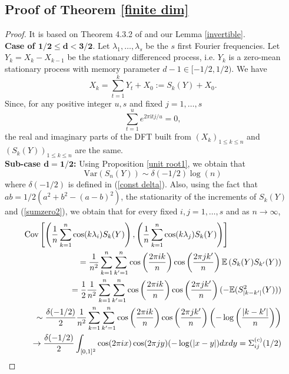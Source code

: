 \documentclass[12pt]{article}
\numberwithin{equation}{section}
\def\i{\mathrm{i}}
\begin{document}
\subsection{Proof of Theorem \ref{finite dim}}
\begin{proof} 
It is based on Theorem 4.3.2 of \cite{MR2977317} and our Lemma \ref{invertible}.\\
{\bf Case of $\mathbf{1/2\le d<3/2.}$} Let $\lambda_1,\ldots,\lambda_s$ be the $s$ first  Fourier frequencies. 
Let $Y_k=X_k-X_{k-1}$ be the stationary differenced process, i.e. $Y_k$ is a zero-mean stationary process with memory parameter $d-1\in[-1/2,1/2)$. We have
$$
X_k=\sum_{t=1}^kY_t+X_0:=S_k(Y)+X_0.
$$
Since, for any positive integer $u,s$ and fixed $j=1,\ldots,s$
\begin{equation}\label{sumzero2}
\sum_{t=1}^ue^{2\pi \i tj/u}=0,
\end{equation}
the real and imaginary parts of the DFT built from $(X_k)_{1\le k\le n}$ and $(S_k(Y))_{1\le k\le n}$ are the same. \\
{\bf Sub-case $\mathbf{d=1/2}$:} 
Using Proposition \ref{unit root1}, we obtain that 
$$
\textrm{Var}(S_n(Y))\sim \delta(-1/2)\log(n)
$$
where $\delta(-1/2)$ is defined in (\ref{const delta}).
Also, using the fact that $ab=1/2\left(a^2+b^2-(a-b)^2\right)$, the stationarity of the increments of $S_k(Y)$ and (\ref{sumzero2}), we obtain that for every fixed $i,j=1,\ldots,s$ and as $n\to\infty$, 
\begin{eqnarray}\label{of course}
\lefteqn{
    \textrm{Cov}\left[\left(\frac{1}{n}\sum_{k=1}^n\cos(k\lambda_{i})S_k(Y)\right),\left(\frac{1}{n}\sum_{k=1}^n\cos(k\lambda_{j})S_k(Y)\right)\right]}\nonumber\\
    &&=\frac{1}{n^2}\sum_{k=1}^n\sum_{k'=1}^n\cos\left(\frac{2\pi ik}{n}\right)\cos\left(\frac{2\pi jk'}{n}\right)\mathbb{E}\left(S_k(Y)S_{k'}(Y)\right)\nonumber\\ 
    &&=\frac{1}{2}\frac{1}{n^2}\sum_{k=1}^n\sum_{k'=1}^n\cos\left(\frac{2\pi ik}{n}\right)\cos\left(\frac{2\pi jk'}{n}\right)(-\mathbb{E}(S^2_{\vert k-k'\vert}(Y)))\nonumber\\
    &&\sim\frac{\delta(-1/2)}{2}\frac{1}{n^2}\sum_{k=1}^n\sum_{k'=1}^n\cos\left(\frac{2\pi ik}{n}\right)\cos\left(\frac{2\pi jk'}{n}\right)\left(-\log\left(\frac{\vert k-k'\vert}{n}\right)\right)\nonumber\\
&&\to\frac{\delta(-1/2)}{2}\int_{[0,1]^2}\cos(2\pi ix)\cos(2\pi jy)(-\log(\vert x- y\vert)dxdy=\Sigma_{ij}^{(c)}(1/2)
\end{eqnarray}

\end{proof}
\end{document}
